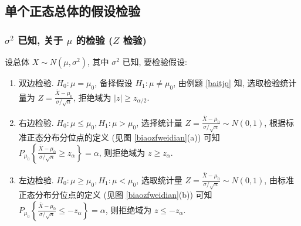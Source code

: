 \subsection{单个正态总体的假设检验}

\subsubsection{\texorpdfstring{$\sigma^2$}. 已知, 关于 \texorpdfstring{$\mu$}. 的检验 (\texorpdfstring{$Z$}. 检验)}

设总体 $ X \sim N\left(\mu, \sigma^{2}\right)$, 其中 $ \sigma^{2} $ 已知, 要检验假设:
\begin{enumerate}[label=(\arabic{*})]
    \item 双边检验. $ H_{0}: \mu=\mu_{0} $, 备择假设 $ H_{1}: \mu \neq \mu_{0} $, 
          由例题 \ref{baitjq} 知, 选取检验统计量为 $\displaystyle Z=\frac{\bar{X}-\mu_{0}}{\sigma / \sqrt{n}}$, 拒绝域为 $ |z| \geqslant z_{\alpha / 2} .$
    \item 右边检验. $ H_{0}: \mu \leqslant \mu_{0}, H_{1}: \mu>\mu_{0} $, 
          选择统计量 $\displaystyle Z=\frac{\bar{X}-\mu_{0}}{\sigma / \sqrt{n}} \sim N(0,1) $, 根据标准正态分布分位点的定义 (见图 \ref{biaozfweidian}(a)) 可知 $\displaystyle P_{\mu_{0}}\left\{\frac{\bar{X}-\mu_{0}}{\sigma / \sqrt{n}} \geqslant z_{\alpha}\right\}=\alpha $, 则拒绝域为 $ z \geqslant z_{\alpha} .$
    \item 左边检验. $ H_{0}: \mu \geqslant \mu_{0}, H_{1}: \mu<\mu_{0} $, 
          选取统计量 $\displaystyle  Z=\frac{\bar{X}-\mu_{0}}{\sigma / \sqrt{n}} \sim N(0,1)$, 由标准正态分布分位点的定义 (见图 \ref{biaozfweidian}(b)) 可知 $\displaystyle P_{\mu_{0}}\left\{\frac{\bar{X}-\mu_{0}}{\sigma / \sqrt{n}} \leqslant-z_{\alpha}\right\}=\alpha$, 则拒绝域为 $ z \leqslant-z_{\alpha} .$
\end{enumerate}

